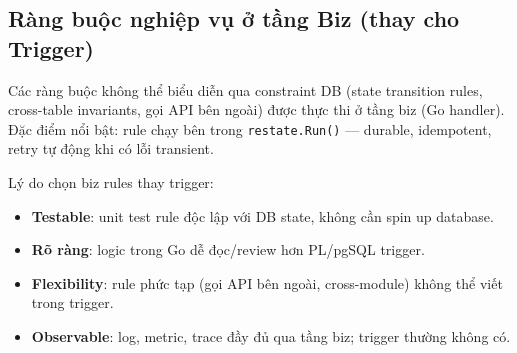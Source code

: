 \subsection{Ràng buộc nghiệp vụ ở tầng Biz (thay cho Trigger)}
\label{subsec:db-biz-rules}

Các ràng buộc không thể biểu diễn qua constraint DB (state transition rules, cross-table invariants, gọi API bên ngoài) được thực thi ở tầng biz (Go handler). Đặc điểm nổi bật: rule chạy bên trong \texttt{restate.Run()} --- durable, idempotent, retry tự động khi có lỗi transient.

Lý do chọn biz rules thay trigger:

\begin{itemize}[nosep]
    \item \textbf{Testable}: unit test rule độc lập với DB state, không cần spin up database.
    \item \textbf{Rõ ràng}: logic trong Go dễ đọc/review hơn PL/pgSQL trigger.
    \item \textbf{Flexibility}: rule phức tạp (gọi API bên ngoài, cross-module) không thể viết trong trigger.
    \item \textbf{Observable}: log, metric, trace đầy đủ qua tầng biz; trigger thường không có.
\end{itemize}

